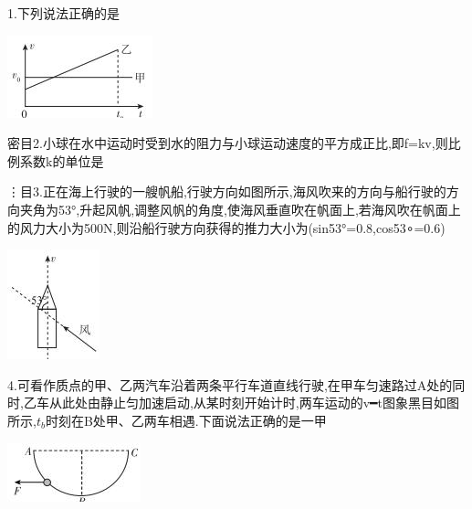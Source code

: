 \question[6] 1.下列说法正确的是
\begin{center}
\includegraphics[]{img/image1.jpeg}
\end{center}

\begin{solution}{4cm}

\end{solution}



\question[6] 密目2.小球在水中运动时受到水的阻力与小球运动速度的平方成正比,即f=kv,则比例系数k的单位是
\begin{solution}{4cm}

\end{solution}



\question[6] ⋮目3.正在海上行驶的一艘帆船,行驶方向如图所示,海风吹来的方向与船行驶的方向夹角为53°,升起风帆,调整风帆的角度,使海风垂直吹在帆面上,若海风吹在帆面上的风力大小为500N,则沿船行驶方向获得的推力大小为(sin53°=0.8,cos53∘=0.6)
\begin{center}
\includegraphics[]{img/image3.jpeg}
\end{center}

\begin{solution}{4cm}

\end{solution}



\question[6] 4.可看作质点的甲、乙两汽车沿着两条平行车道直线行驶,在甲车匀速路过A处的同时,乙车从此处由静止匀加速启动,从某时刻开始计时,两车运动的v━t图象黑目如图所示,$t_b$时刻在B处甲、乙两车相遇.下面说法正确的是一甲
\begin{center}
\includegraphics[]{img/image4.jpeg}
\end{center}

